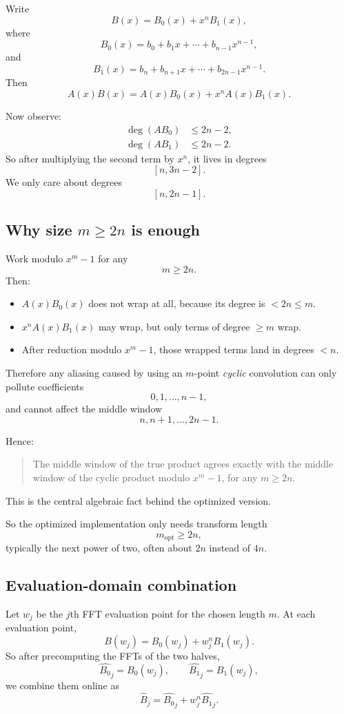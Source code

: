 \documentclass[11pt]{article}
\begin{document}
Write
\[
B(x) = B_0(x) + x^n B_1(x),
\]
where
\[
B_0(x) = b_0 + b_1 x + \cdots + b_{n-1} x^{n-1},
\]
and
\[
B_1(x) = b_n + b_{n+1} x + \cdots + b_{2n-1} x^{n-1}.
\]
Then
\[
A(x)B(x) = A(x)B_0(x) + x^n A(x)B_1(x).
\]

Now observe:
\begin{align*}
\deg(A B_0) &\le 2n-2,\\
\deg(A B_1) &\le 2n-2.
\end{align*}
So after multiplying the second term by $x^n$, it lives in degrees
\[
[n, 3n-2].
\]
We only care about degrees
\[
[n, 2n-1].
\]

\subsection{Why size $m \ge 2n$ is enough}

Work modulo $x^m - 1$ for any
\[
m \ge 2n.
\]
Then:
\begin{itemize}[itemsep=0.3em, topsep=0.4em]
  \item $A(x)B_0(x)$ does not wrap at all, because its degree is $< 2n \le m$.
  \item $x^n A(x)B_1(x)$ may wrap, but only terms of degree $\ge m$ wrap.
  \item After reduction modulo $x^m-1$, those wrapped terms land in degrees $< n$.
\end{itemize}

Therefore any aliasing caused by using an $m$-point \emph{cyclic} convolution can only pollute coefficients
\[
0,1,\dots,n-1,
\]
and cannot affect the middle window
\[
n,n+1,\dots,2n-1.
\]

Hence:

\begin{quote}
The middle window of the true product agrees exactly with the middle window of the cyclic product modulo $x^m-1$, for any $m \ge 2n$.
\end{quote}

This is the central algebraic fact behind the optimized version.

So the optimized implementation only needs transform length
\[
m_{\mathrm{opt}} \ge 2n,
\]
typically the next power of two, often about $2n$ instead of $4n$.

\subsection{Evaluation-domain combination}

Let $w_j$ be the $j$th FFT evaluation point for the chosen length $m$. At each evaluation point,
\[
B(w_j) = B_0(w_j) + w_j^n B_1(w_j).
\]
So after precomputing the FFTs of the two halves,
\[
\widehat{B_0}_j = B_0(w_j),
\qquad
\widehat{B_1}_j = B_1(w_j),
\]
we combine them online as
\[
\widehat{B}_j = \widehat{B_0}_j + w_j^n \widehat{B_1}_j.
\]
\end{document}
